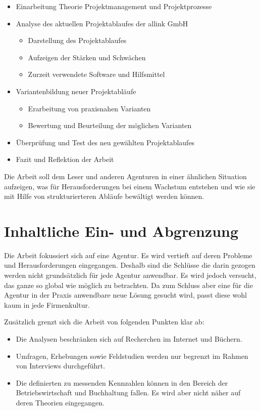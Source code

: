 \begin{itemize}
    \item Einarbeitung Theorie Projektmanagement und Projektprozesse
    \item Analyse des aktuellen Projektablaufes der allink GmbH
    \begin{itemize}
        \item Darstellung des Projektablaufes
        \item Aufzeigen der Stärken und Schwächen
        \item Zurzeit verwendete Software und Hilfsmittel
    \end{itemize}
    \item Variantenbildung neuer Projektabläufe
    \begin{itemize}
        \item Erarbeitung von praxisnahen Varianten
        \item Bewertung und Beurteilung der möglichen Varianten
    \end{itemize}
    \item Überprüfung und Test des neu gewählten Projektablaufes
    \item Fazit und Reflektion der Arbeit
\end{itemize}

Die Arbeit soll dem Leser und anderen Agenturen in einer ähnlichen Situation
aufzeigen, was für Herausforderungen bei einem Wachstum entstehen und wie
sie mit Hilfe von strukturierteren Abläufe bewältigt werden können.

\section{Inhaltliche Ein- und Abgrenzung}
Die Arbeit fokussiert sich auf eine Agentur. Es wird vertieft auf deren Probleme
und Herausforderungen eingegangen. Deshalb sind die Schlüsse die darin gezogen
werden nicht grundsätzlich für jede Agentur anwendbar. Es wird jedoch versucht, das
ganze so global wie möglich zu betrachten. Da zum Schluss aber eine für die
Agentur in der Praxis anwendbare neue Lösung gesucht wird, passt diese wohl
kaum in jede Firmenkultur.

Zusätzlich grenzt sich die Arbeit von folgenden Punkten klar ab:

\begin{itemize}
    \item Die Analysen beschränken sich auf Recherchen im Internet und Büchern.
    \item Umfragen, Erhebungen sowie Feldstudien werden nur begrenzt im Rahmen
        von Interviews durchgeführt.
    \item Die definierten zu messenden Kennzahlen können in den Bereich der Betriebswirtschaft
        und Buchhaltung fallen. Es wird aber nicht näher auf deren Theorien eingegangen.
\end{itemize}


